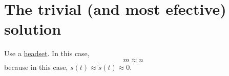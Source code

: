 \section{The trivial (and most efective) solution}

Use a \href{https://en.wikipedia.org/wiki/Audio_headset}{headset}. In
this case,
\begin{equation}
  m \approx n
  \label{eq:headset_solution}
\end{equation}
because in this case, $s(t)\approx\tilde{s}(t)\approx 0$.

